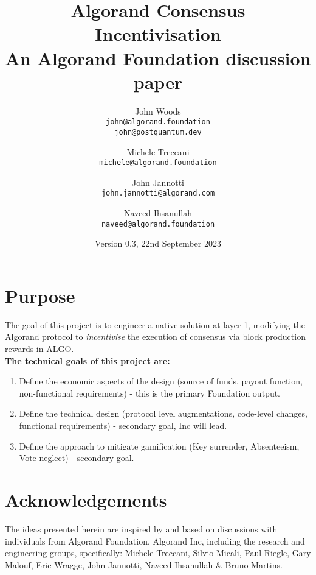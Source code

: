 \documentclass[11pt,a4paper]{article}
\begin{document}
\title {Algorand Consensus Incentivisation \\
       {\large \sc An Algorand Foundation discussion paper}}
\date  {Version 0.3, 22nd September 2023}
\author{
    John Woods \\ 
    {\small \texttt{john@algorand.foundation}} \\
    {\small \texttt{john@postquantum.dev}} \\
\and 
    Michele Treccani \\
    {\small \texttt{michele@algorand.foundation}}
\and 
    John Jannotti \\
    {\small \texttt{john.jannotti@algorand.com}}
\and 
    Naveed Ihsanullah \\
    {\small \texttt{naveed@algorand.foundation}}
}

\maketitle

\section{Purpose}
The goal of this project is to engineer a native solution at layer 1, modifying the Algorand protocol to 
\emph{incentivise} the execution of consensus via block production rewards in ALGO. \\

\textbf{The technical goals of this project are:}

\begin{enumerate}
    \item Define the economic aspects of the design (source of funds, payout function, non-functional requirements) - 
        this is the primary Foundation output.
    \item Define the technical design (protocol level augmentations, code-level changes, functional requirements) 
        - secondary goal, Inc will lead.
    \item Define the approach to mitigate gamification (Key surrender, Absenteeism, Vote neglect) - secondary goal.
\end{enumerate}

\pagebreak

\tableofcontents

\pagebreak

\section{Acknowledgements}
The ideas presented herein are inspired by and based on discussions with individuals from Algorand Foundation, 
Algorand Inc, including the research and engineering groups, specifically: Michele Treccani, Silvio Micali, Paul Riegle, 
Gary Malouf, Eric Wragge, John Jannotti, Naveed Ihsanullah \& Bruno Martins.
\end{document}
